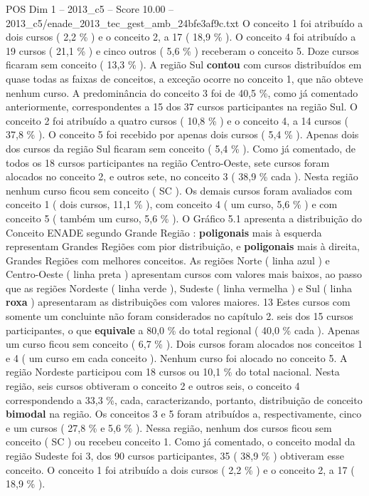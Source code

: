 \begin{textsample}{POS Dim 1 – 2013\_c5 – Score 10.00 – 2013\_c5/enade\_2013\_tec\_gest\_amb\_24bfe3af9c.txt}
O conceito 1 foi atribuído a dois cursos ( 2,2 \% ) e o conceito 2, a 17 ( 18,9 \% ).
O conceito 4 foi atribuído a 19 cursos ( 21,1 \% ) e cinco outros ( 5,6 \% ) receberam o conceito 5.
Doze cursos ficaram sem conceito ( 13,3 \% ).
A região Sul \textbf{contou} com cursos distribuídos em quase todas as faixas de conceitos, a exceção ocorre no conceito 1, que não obteve nenhum curso.
A predominância do conceito 3 foi de 40,5 \%, como já comentado anteriormente, correspondentes a 15 dos 37 cursos participantes na região Sul.
O conceito 2 foi atribuído a quatro cursos ( 10,8 \% ) e o conceito 4, a 14 cursos ( 37,8 \% ).
O conceito 5 foi recebido por apenas dois cursos ( 5,4 \% ).
Apenas dois dos cursos da região Sul ficaram sem conceito ( 5,4 \% ).
Como já comentado, de todos os 18 cursos participantes na região Centro-Oeste, sete cursos foram alocados no conceito 2, e outros sete, no conceito 3 ( 38,9 \% cada ).
Nesta região nenhum curso ficou sem conceito ( SC ).
Os demais cursos foram avaliados com conceito 1 ( dois cursos, 11,1 \% ), com conceito 4 ( um curso, 5,6 \% ) e com conceito 5 ( também um curso, 5,6 \% ).
O Gráfico 5.1 apresenta a distribuição do Conceito ENADE segundo Grande Região : \textbf{poligonais} mais à esquerda representam Grandes Regiões com pior distribuição, e \textbf{poligonais} mais à direita, Grandes Regiões com melhores conceitos.
As regiões Norte ( linha azul ) e Centro-Oeste ( linha preta ) apresentam cursos com valores mais baixos, ao passo que as regiões Nordeste ( linha verde ), Sudeste ( linha vermelha ) e Sul ( linha \textbf{roxa} ) apresentaram as distribuições com valores maiores. 13 Estes cursos com somente um concluinte não foram considerados no capítulo 2. seis dos 15 cursos participantes, o que \textbf{equivale} a 80,0 \% do total regional ( 40,0 \% cada ).
Apenas um curso ficou sem conceito ( 6,7 \% ).
Dois cursos foram alocados nos conceitos 1 e 4 ( um curso em cada conceito ).
Nenhum curso foi alocado no conceito 5.
A região Nordeste participou com 18 cursos ou 10,1 \% do total nacional.
Nesta região, seis cursos obtiveram o conceito 2 e outros seis, o conceito 4 correspondendo a 33,3 \%, cada, caracterizando, portanto, distribuição de conceito \textbf{bimodal} na região.
Os conceitos 3 e 5 foram atribuídos a, respectivamente, cinco e um cursos ( 27,8 \% e 5,6 \% ).
Nessa região, nenhum dos cursos ficou sem conceito ( SC ) ou recebeu conceito 1.
Como já comentado, o conceito modal da região Sudeste foi 3, dos 90 cursos participantes, 35 ( 38,9 \% ) obtiveram esse conceito.
O conceito 1 foi atribuído a dois cursos ( 2,2 \% ) e o conceito 2, a 17 ( 18,9 \% ).

\end{textsample}
